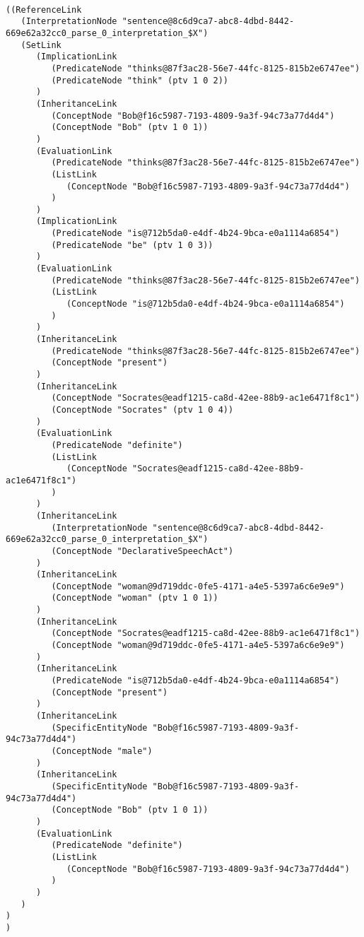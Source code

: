  {\tt\begin{small}\begin{lstlisting}

((ReferenceLink
   (InterpretationNode "sentence@8c6d9ca7-abc8-4dbd-8442-669e62a32cc0_parse_0_interpretation_$X")
   (SetLink
      (ImplicationLink
         (PredicateNode "thinks@87f3ac28-56e7-44fc-8125-815b2e6747ee")
         (PredicateNode "think" (ptv 1 0 2))
      )
      (InheritanceLink
         (ConceptNode "Bob@f16c5987-7193-4809-9a3f-94c73a77d4d4")
         (ConceptNode "Bob" (ptv 1 0 1))
      )
      (EvaluationLink
         (PredicateNode "thinks@87f3ac28-56e7-44fc-8125-815b2e6747ee")
         (ListLink
            (ConceptNode "Bob@f16c5987-7193-4809-9a3f-94c73a77d4d4")
         )
      )
      (ImplicationLink
         (PredicateNode "is@712b5da0-e4df-4b24-9bca-e0a1114a6854")
         (PredicateNode "be" (ptv 1 0 3))
      )
      (EvaluationLink
         (PredicateNode "thinks@87f3ac28-56e7-44fc-8125-815b2e6747ee")
         (ListLink
            (ConceptNode "is@712b5da0-e4df-4b24-9bca-e0a1114a6854")
         )
      )
      (InheritanceLink
         (PredicateNode "thinks@87f3ac28-56e7-44fc-8125-815b2e6747ee")
         (ConceptNode "present")
      )
      (InheritanceLink
         (ConceptNode "Socrates@eadf1215-ca8d-42ee-88b9-ac1e6471f8c1")
         (ConceptNode "Socrates" (ptv 1 0 4))
      )
      (EvaluationLink
         (PredicateNode "definite")
         (ListLink
            (ConceptNode "Socrates@eadf1215-ca8d-42ee-88b9-ac1e6471f8c1")
         )
      )
      (InheritanceLink
         (InterpretationNode "sentence@8c6d9ca7-abc8-4dbd-8442-669e62a32cc0_parse_0_interpretation_$X")
         (ConceptNode "DeclarativeSpeechAct")
      )
      (InheritanceLink
         (ConceptNode "woman@9d719ddc-0fe5-4171-a4e5-5397a6c6e9e9")
         (ConceptNode "woman" (ptv 1 0 1))
      )
      (InheritanceLink
         (ConceptNode "Socrates@eadf1215-ca8d-42ee-88b9-ac1e6471f8c1")
         (ConceptNode "woman@9d719ddc-0fe5-4171-a4e5-5397a6c6e9e9")
      )
      (InheritanceLink
         (PredicateNode "is@712b5da0-e4df-4b24-9bca-e0a1114a6854")
         (ConceptNode "present")
      )
      (InheritanceLink
         (SpecificEntityNode "Bob@f16c5987-7193-4809-9a3f-94c73a77d4d4")
         (ConceptNode "male")
      )
      (InheritanceLink
         (SpecificEntityNode "Bob@f16c5987-7193-4809-9a3f-94c73a77d4d4")
         (ConceptNode "Bob" (ptv 1 0 1))
      )
      (EvaluationLink
         (PredicateNode "definite")
         (ListLink
            (ConceptNode "Bob@f16c5987-7193-4809-9a3f-94c73a77d4d4")
         )
      )
   )
)
)

\end{lstlisting}\end{small}}

